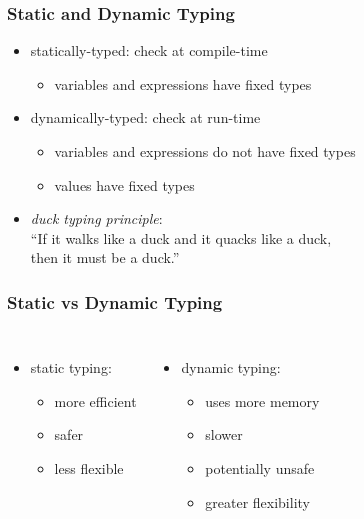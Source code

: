 \documentclass[dvipsnames]{beamer}
\theoremstyle{plain}
\begin{document}
\begin{frame}
  \frametitle{Static and Dynamic Typing}

  \begin{itemize}
    \item \alert{statically-typed}: check at compile-time
    \begin{itemize}
      \item variables and expressions have fixed types
    \end{itemize}

    \pause
    \bigskip
    \item \alert{dynamically-typed}: check at run-time
    \begin{itemize}
      \item variables and expressions do not have fixed types
      \item values have fixed types
    \end{itemize}
    \pause
    \item \emph{duck typing principle}:\\
      ``If it walks like a duck and it quacks like a duck,\\
      then it must be a duck.''
  \end{itemize}
\end{frame}

\begin{frame}
  \frametitle{Static vs Dynamic Typing}

  \begin{columns}[t]
    \begin{itemize}
      \item static typing:
      \begin{itemize}
        \item more efficient
        \item safer
        \item less flexible
      \end{itemize}
    \end{itemize}

    \pause
    \begin{itemize}
      \item dynamic typing:
      \begin{itemize}
        \item uses more memory
        \item slower
        \item potentially unsafe
        \item greater flexibility
      \end{itemize}
    \end{itemize}
  \end{columns}
\end{frame}
\end{document}
